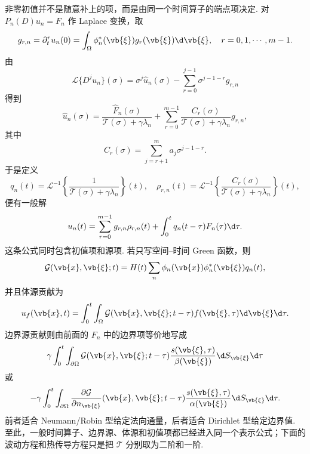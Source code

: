 非零初值并不是随意补上的项，而是由同一个时间算子的端点项决定. 对 $P_n(D)u_n=F_n$ 作 Laplace 变换，取
\begin{equation*}
	g_{r,n}=\partial_t^r u_n(0)
	=\int_\Omega\phi_n^*(\vb{\xi})g_r(\vb{\xi})\d\vb{\xi},
	\quad r=0,1,\cdots,m-1.
\end{equation*}
由
\begin{equation*}
	\mathcal{L}\{D^j u_n\}(\sigma)
	=\sigma^j\widehat{u}_n(\sigma)
	-\sum_{r=0}^{j-1}\sigma^{j-1-r}g_{r,n}
\end{equation*}
得到
\begin{equation*}
	\widehat{u}_n(\sigma)
	=\frac{\widehat{F}_n(\sigma)}{\mathcal{T}(\sigma)+\gamma\lambda_n}
	+\sum_{r=0}^{m-1}
	\frac{C_r(\sigma)}{\mathcal{T}(\sigma)+\gamma\lambda_n}g_{r,n},
\end{equation*}
其中
\begin{equation*}
	C_r(\sigma)=\sum_{j=r+1}^m a_j\sigma^{j-1-r}.
\end{equation*}
于是定义
\begin{equation*}
	q_n(t)=\mathcal{L}^{-1}\left\{
	\frac{1}{\mathcal{T}(\sigma)+\gamma\lambda_n}
	\right\}(t),
	\quad
\rho_{r,n}(t)=\mathcal{L}^{-1}\left\{
	\frac{C_r(\sigma)}{\mathcal{T}(\sigma)+\gamma\lambda_n}
	\right\}(t),
\end{equation*}
便有一般解
\begin{equation*}
	u_n(t)=\sum_{r=0}^{m-1}g_{r,n}\rho_{r,n}(t)
	+\int_0^tq_n(t-\tau)F_n(\tau)\d\tau.
\end{equation*}
这条公式同时包含初值项和源项. 若只写空间--时间 Green 函数，则
\begin{equation*}
	\mathcal{G}(\vb{x},\vb{\xi};t)
	=H(t)\sum_n\phi_n(\vb{x})\phi_n^*(\vb{\xi})q_n(t),
\end{equation*}
并且体源贡献为
\begin{equation*}
	u_f(\vb{x},t)=\int_0^t\int_\Omega
	\mathcal{G}(\vb{x},\vb{\xi};t-\tau)f(\vb{\xi},\tau)
	\d\vb{\xi}\d\tau.
\end{equation*}
边界源贡献则由前面的 $F_n$ 中的边界项等价地写成
\begin{equation*}
	\gamma\int_0^t\int_{\partial\Omega}
	\mathcal{G}(\vb{x},\vb{\xi};t-\tau)
	\frac{s(\vb{\xi},\tau)}{\beta(\vb{\xi})}\d S_{\vb{\xi}}\d\tau
\end{equation*}
或
\begin{equation*}
	-\gamma\int_0^t\int_{\partial\Omega}
	\frac{\partial\mathcal{G}}{\partial n_{\vb{\xi}}}(\vb{x},\vb{\xi};t-\tau)
	\frac{s(\vb{\xi},\tau)}{\alpha(\vb{\xi})}\d S_{\vb{\xi}}\d\tau.
\end{equation*}
前者适合 Neumann/Robin 型给定法向通量，后者适合 Dirichlet 型给定边界值. 至此，一般时间算子、边界源、体源和初值项都已经进入同一个表示公式；下面的波动方程和热传导方程只是把 $\mathcal{T}$ 分别取为二阶和一阶.

